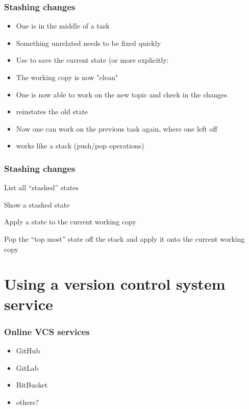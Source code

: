 \documentclass{git_course}
\begin{document}
\begin{frame}
\frametitle{Stashing changes}
\begin{itemize}
    \item One is in the middle of a task
    \item Something unrelated needs to be fixed quickly
    \item Use  to save the current state (or more
        explicitly: 
    \item The working copy is now "clean"
    \item One is now able to work on the new topic and check in the
        changes
    \item {} reinstates the old state
    \item Now one can work on the previous task again, where one
        left off
    \item {} works like a stack (push/pop operations)
\end{itemize}
\end{frame}

\begin{frame}
\frametitle{Stashing changes}

\begin{description}
    \item {} List all “stashed” states
    \item {} Show a stashed state
    \item {} Apply a state to the current working copy
    \item {} Pop the “top most” state off the stack and
        apply it onto the current working copy
\end{description}
\end{frame}

\section{Using a version control system service}

\begin{frame}
    \frametitle{Online VCS services}
    \begin{itemize}
        \item GitHub
        \item GitLab
        \item BitBucket
        \item others?
    \end{itemize}
\end{frame}
\end{document}
